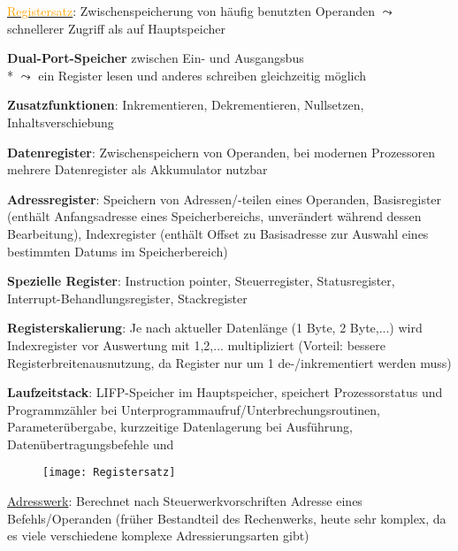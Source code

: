 \begin{items}
	\item \underline{\textcolor{orange}{Registersatz}}: Zwischenspeicherung von häufig benutzten Operanden $\leadsto$ schnellerer Zugriff als auf Hauptspeicher
	\begin{enumeration}
		\item \textbf{Dual-Port-Speicher} zwischen Ein- und Ausgangsbus \\* $\leadsto$ ein Register lesen und anderes schreiben gleichzeitig möglich
		\item \textbf{Zusatzfunktionen}: Inkrementieren, Dekrementieren, Nullsetzen, Inhaltsverschiebung
		\item \textbf{Datenregister}: Zwischenspeichern von Operanden, bei modernen Prozessoren mehrere Datenregister als Akkumulator nutzbar
		\item \textbf{Adressregister}: Speichern von Adressen/-teilen eines Operanden, Basisregister (enthält Anfangsadresse eines Speicherbereichs, unverändert während dessen Bearbeitung), Indexregister (enthält Offset zu Basisadresse zur Auswahl eines bestimmten Datums im Speicherbereich)
		\item \textbf{Spezielle Register}: Instruction pointer, Steuerregister, Statusregister, Interrupt-Behandlungsregister, Stackregister
		\item \textbf{Registerskalierung}: Je nach aktueller Datenlänge (1 Byte, 2 Byte,...) wird Indexregister vor Auswertung mit 1,2,... multipliziert (Vorteil: bessere Registerbreitenausnutzung, da Register nur um 1 de-/inkrementiert werden muss)
		\item \textbf{Laufzeitstack}: LIFP-Speicher im Hauptspeicher, speichert Prozessorstatus und Programmzähler bei Unterprogrammaufruf/Unterbrechungsroutinen, Parameterübergabe, kurzzeitige Datenlagerung bei Ausführung, Datenübertragungsbefehle  und 
	\end{enumeration}
	\begin{figure}[ht]
	  \centering
	  \texttt{[image: Registersatz]}
	  \label{Registersatz}
	\end{figure}

	\item \underline{\textcolor{ProcessBlue}{Adresswerk}}: Berechnet nach Steuerwerkvorschriften Adresse eines Befehls/Operanden (früher Bestandteil des Rechenwerks, heute sehr komplex, da es viele verschiedene komplexe Adressierungsarten gibt)


\end{items}
